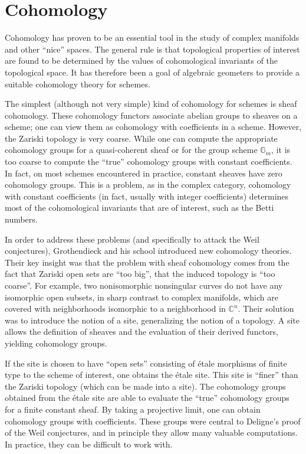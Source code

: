 \documentclass[12pt]{article}
\newcommand{\sect}[1]{\clearpage\section*{#1}}
\begin{document}
\sect{Cohomology}

Cohomology has proven to be an essential tool in the study of complex manifolds and other ``nice'' spaces.  The general rule is that topological properties of interest are found to be determined by the values of cohomological invariants of the topological space.  It has therefore been a goal of algebraic geometers to provide a suitable cohomology theory for schemes.

The simplest (although not very simple) kind of cohomology for schemes is sheaf cohomology.  These cohomology functors associate abelian groups to sheaves on a scheme; one can view them as cohomology with coefficients in a scheme.  However, the Zariski topology is very coarse.  While one can compute the appropriate cohomology groups for a quasi-coherent sheaf or for the group scheme $\mathbb{G}_m$, it is too coarse to compute the ``true'' cohomology groups with constant coefficients.  In fact, on most schemes encountered in practice, constant sheaves have zero cohomology groups.  This is a problem, as in the complex category, cohomology with constant coefficients (in fact, usually with integer coefficients) determines most of the cohomological invariants that are of interest, such as the Betti numbers.

In order to address these problems (and specifically to attack the Weil conjectures), Grothendieck and his school introduced new cohomology theories.  Their key insight was that the problem with sheaf cohomology comes from the fact that Zariski open sets are ``too big'', that the induced topology is ``too coarse''.  For example, two nonisomorphic nonsingular curves do not have any isomorphic open subsets, in sharp contrast to complex manifolds, which are covered with neighborhoods isomorphic to a neighborhood in $\mathbb{C}^n$.  Their solution was to introduce the notion of a site, generalizing the notion of a topology.  A site allows the definition of sheaves and the evaluation of their derived functors, yielding cohomology groups.

If the site is chosen to have ``open sets'' consisting of \'etale morphisms of finite type to the scheme of interest, one obtains the \'etale site.  This site is ``finer'' than the Zariski topology (which can be made into a site).  The cohomology groups obtained from the \'etale site are able to evaluate the ``true'' cohomology groups for a finite constant sheaf.  By taking a projective limit, one can obtain cohomology groups with  coefficients.  These groups were central to Deligne's proof of the Weil conjectures, and in principle they allow many valuable computations.  In practice, they can be difficult to work with.
\end{document}
